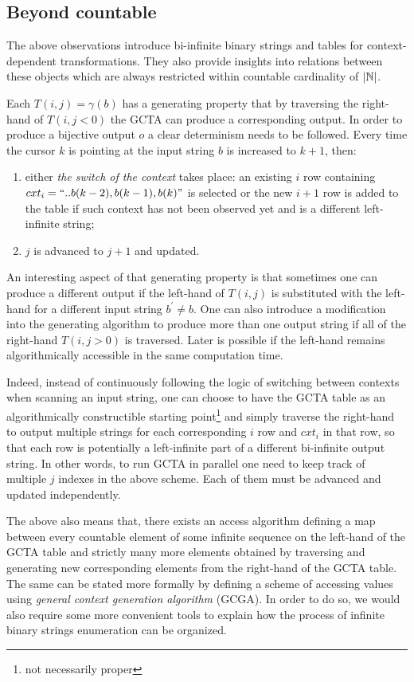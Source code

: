 \subsection{Beyond countable}

The above observations introduce bi-infinite binary strings and tables for context-dependent transformations. They also provide insights into relations between these objects which are always restricted within countable cardinality of $|\mathbb{N}|$.

Each $T(i,j)=\gamma(b)$ has a generating property that by traversing the right-hand of $T(i,j<0)$ the GCTA can produce a corresponding output. In order to produce a bijective output $o$ a clear determinism needs to be followed. Every time the cursor $k$ is pointing at the input string $b$ is increased to $k + 1$, then: 

\begin{enumerate}
\item either \textit{the switch of the context} takes place: an existing $i$ row containing $cxt_i = \text{``}..b(k-2),b(k-1),b(k)\text{''}$ is selected or the new $i+1$ row is added to the table if such context has not been observed yet and is a different left-infinite string;
\item $j$ is advanced to $j+1$ and updated. 
\end{enumerate}

An interesting aspect of that generating property is that sometimes one can produce a different output if the left-hand of $T(i,j)$ is substituted with the left-hand for a different input string $b^\prime \neq b$. One can also introduce a modification into the generating algorithm to produce more than one output string if all of the right-hand $T(i,j>0)$ is traversed. Later is possible if the left-hand remains algorithmically accessible in the same computation time. 

Indeed, instead of continuously following the logic of switching between contexts when scanning an input string, one can choose to have the GCTA table as an algorithmically constructible starting point\footnote{not necessarily proper} and simply traverse the right-hand to output multiple strings for each corresponding $i$ row and $cxt_i$ in that row, so that each row is potentially a left-infinite part of a different bi-infinite output string. In other words, to run GCTA in parallel one need to keep track of multiple $j$ indexes in the above scheme. Each of them must be advanced and updated independently.

The above also means that, there exists an access algorithm defining a map between every countable element of some infinite sequence on the left-hand of the GCTA table and strictly many more elements obtained by traversing and generating new corresponding elements from the right-hand of the GCTA table. The same can be stated more formally by defining a scheme of accessing values using \textit{general context generation algorithm} (GCGA). In order to do so, we would also require some more convenient tools to explain how the process of infinite binary strings enumeration can be organized.
